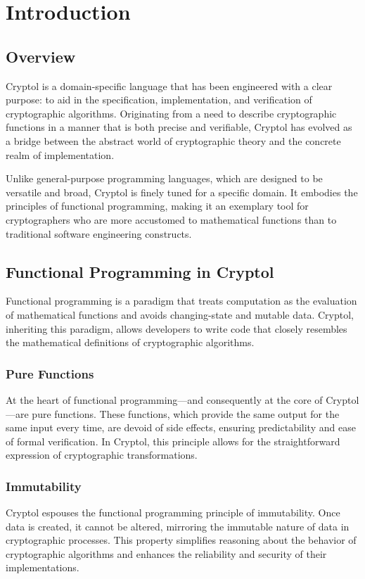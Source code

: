 \chapter*{Introduction}

\section*{Overview}

Cryptol is a domain-specific language that has been engineered with a clear purpose: to aid in the specification, implementation, and verification of cryptographic algorithms. Originating from a need to describe cryptographic functions in a manner that is both precise and verifiable, Cryptol has evolved as a bridge between the abstract world of cryptographic theory and the concrete realm of implementation.

Unlike general-purpose programming languages, which are designed to be versatile and broad, Cryptol is finely tuned for a specific domain. It embodies the principles of functional programming, making it an exemplary tool for cryptographers who are more accustomed to mathematical functions than to traditional software engineering constructs.

\section*{Functional Programming in Cryptol}
Functional programming is a paradigm that treats computation as the evaluation of mathematical functions and avoids changing-state and mutable data. Cryptol, inheriting this paradigm, allows developers to write code that closely resembles the mathematical definitions of cryptographic algorithms.

\subsection*{Pure Functions}
At the heart of functional programming—and consequently at the core of Cryptol—are pure functions. These functions, which provide the same output for the same input every time, are devoid of side effects, ensuring predictability and ease of formal verification. In Cryptol, this principle allows for the straightforward expression of cryptographic transformations.

\subsection*{Immutability}
Cryptol espouses the functional programming principle of immutability. Once data is created, it cannot be altered, mirroring the immutable nature of data in cryptographic processes. This property simplifies reasoning about the behavior of cryptographic algorithms and enhances the reliability and security of their implementations.

